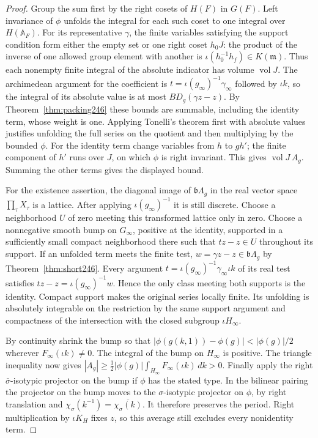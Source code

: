 \documentclass[a4paper,11pt]{article}
\theoremstyle{definition}
\theoremstyle{remark}
\numberwithin{equation}{section}
\begin{document}
\begin{proof}
Group the sum first by the right cosets of \(H(F)\) in \(G(F)\).
Left invariance of \(\phi\) unfolds the integral for each such
coset to one integral over \(H(\mathbb A_F)\). For its
representative \(\gamma\), the finite variables satisfying the
support condition form either the empty set or one right coset
\(h_0J\): the product of the inverse of one allowed group element
with another is \(\iota(h_0^{-1}h_f)\in K(\mathfrak m)\).
Thus each nonempty finite integral of the absolute indicator
has volume \(\operatorname{vol}J\). The archimedean argument for
the coefficient is \(t=\iota(g_\infty)^{-1}\gamma_\infty\)
followed by \(\iota k\), so the integral of its absolute value
is at most \(B D_g(\gamma z-z)\).
By Theorem~\ref{thm:packing246} these bounds are summable, including
the identity term, whose weight is one. Applying Tonelli's theorem
first with absolute values justifies unfolding the full series on
the quotient and then multiplying by the bounded \(\phi\).
For the identity term change variables from \(h\) to \(g h'\);
the finite component of \(h'\) runs over \(J\), on which \(\phi\)
is right invariant. This gives \(\operatorname{vol}J\,A_g\).
Summing the other terms gives the displayed bound.

For the existence assertion, the diagonal image of
\(\mathfrak b\Lambda_g\) in the real vector space
\(\prod_\tau X_\tau\) is a lattice. After applying
\(\iota(g_\infty)^{-1}\) it is still discrete. Choose a neighborhood
\(U\) of zero meeting this transformed lattice only in zero. Choose
a nonnegative smooth bump on \(G_\infty\), positive at the identity,
supported in a sufficiently small compact neighborhood there such that
\(tz-z\in U\) throughout its support. If an unfolded term meets the
finite test, \(w=\gamma z-z\in\mathfrak b\Lambda_g\) by
Theorem~\ref{thm:short246}. Every argument
\(t=\iota(g_\infty)^{-1}\gamma_\infty\iota k\) of its real test
satisfies \(tz-z=\iota(g_\infty)^{-1}w\). Hence the only class
meeting both supports is the identity. Compact support makes
the original series locally finite. Its unfolding is absolutely
integrable on the restriction by the same support argument and
compactness of the intersection with the closed subgroup \(\iota H_\infty\).

By continuity shrink the bump so that
\(|\phi(g(k,1))-\phi(g)|<|\phi(g)|/2\) wherever
\(F_\infty(\iota k)\ne0\). The integral of the bump on \(H_\infty\)
is positive. The triangle inequality now gives
\(|A_g|\ge \tfrac12|\phi(g)|\int_{H_\infty} F_\infty(\iota k)\,dk>0\).
Finally apply the right \(\bar\sigma\)-isotypic projector on the
bump if \(\phi\) has the stated type. In the bilinear pairing the
projector on the bump moves to the \(\sigma\)-isotypic projector
on \(\phi\), by right translation and
\(\chi_\sigma(k^{-1})=\overline{\chi_\sigma(k)}\). It therefore
preserves the period. Right multiplication by \(\iota K_H\) fixes
\(z\), so this average still excludes every nonidentity term.
\end{proof}
\end{document}
